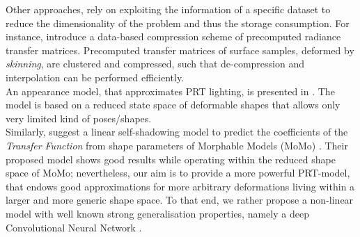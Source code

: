 Other approaches, rely on exploiting the information of a specific dataset to reduce the dimensionality of the problem and thus the storage consumption. For instance, \cite{SkinningPRT} introduce a data-based compression scheme of precomputed radiance transfer matrices. Precomputed transfer matrices of surface samples, deformed by \textit{skinning}, are clustered and compressed, such that de-compression and interpolation can be performed efficiently.
\\  
An appearance model, that approximates PRT lighting, is presented in  \cite{James_Fatahalian}. The model is based on a reduced state space of deformable shapes that allows only very limited kind of poses/shapes. 
\\
Similarly, \cite{MoMoPRT} suggest a linear self-shadowing model to predict the coefficients of the \textit{Transfer Function} from shape parameters of Morphable Models (MoMo) \cite{MoMo}. Their proposed model shows good results while operating within the reduced shape space of MoMo; nevertheless, our aim is to provide a more powerful PRT-model, that endows good approximations for more arbitrary deformations living within a larger and more generic shape space. To that end, we rather propose a non-linear model with well known strong generalisation properties, namely a deep Convolutional Neural Network \cite{DL_nature, ImageNet_CNN, CNN_videoClassification}.  
